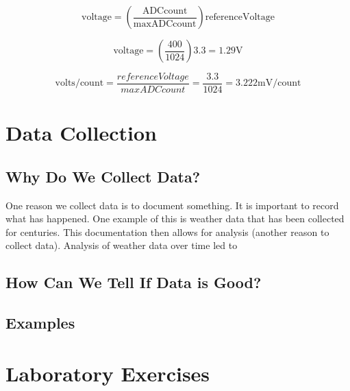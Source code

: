 \begin{equation}
	\label{eq:adc2volt}
	\mathrm{voltage} = \left(\frac{\mathrm{ADCcount}}{\mathrm{maxADCcount}}\right)\mathrm{referenceVoltage}
\end{equation}

\begin{equation}
	\label{eq:adc2voltex}
	\mathrm{voltage} = \left(\frac{400}{1024}\right)3.3 = 1.29\mathrm{V}
\end{equation}

\begin{equation}
	\label{eq:adcpercount}
	\mathrm{volts/count} = \frac{referenceVoltage}{maxADCcount} = \frac{3.3}{1024} = 3.222\mathrm{mV}/\mathrm{count}
\end{equation}


\section{Data Collection}

\subsection{Why Do We Collect Data?}
One reason we collect data is to document something. It is important to record what has happened. One example of this 
is weather data that has been collected for centuries. This documentation then allows for analysis (another reason to 
collect data). Analysis of weather data over time led to 

\subsection{How Can We Tell If Data is Good?}

\subsection{Examples}

\section{Laboratory Exercises}
